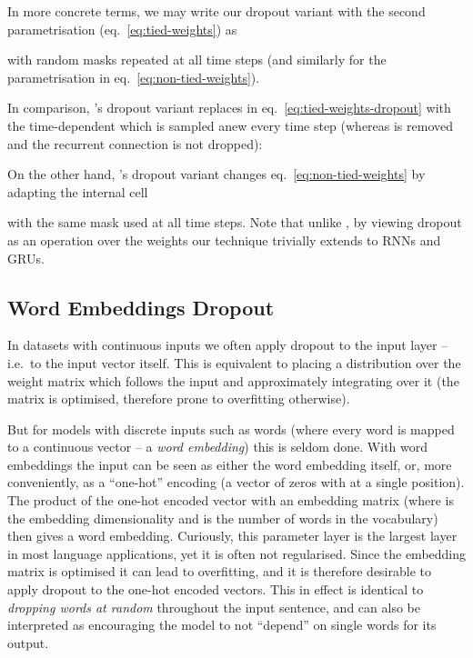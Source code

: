 \documentclass{article}
\theoremstyle{definition}
\begin{document}
\newcommand{\bd}{\mathtt{z}}
In more concrete terms, we may write our dropout variant with the second parametrisation (eq.\ \eqref{eq:tied-weights}) as 

with  random masks repeated at all time steps (and similarly for the parametrisation in eq.\ \eqref{eq:non-tied-weights}). 






In comparison, \citet{zaremba2014recurrent}'s dropout variant replaces  in eq.\ \eqref{eq:tied-weights-dropout} with the time-dependent  which is sampled anew every time step (whereas  is removed and the recurrent connection  is not dropped):

On the other hand, \citet{moon2015rnndrop}'s dropout variant changes eq.\ \eqref{eq:non-tied-weights} by adapting the internal cell 

with the same mask  used at all time steps. Note that unlike \citep{moon2015rnndrop}, by viewing dropout as an operation over the weights our technique trivially extends to RNNs and GRUs.










\subsection{Word Embeddings Dropout}
In datasets with continuous inputs we often apply dropout to the input layer -- i.e.\ to the input vector itself. This is equivalent to placing a distribution over the weight matrix which follows the input and approximately integrating over it (the matrix is optimised, therefore prone to overfitting otherwise). 


But for models with discrete inputs such as words (where every word is mapped to a continuous vector -- a \textit{word embedding}) this is seldom done.
With word embeddings the input can be seen as either the word embedding itself, or, more conveniently, as a ``one-hot'' encoding (a vector of zeros with  at a single position). The product of the one-hot encoded vector with an embedding matrix  (where  is the embedding dimensionality and  is the number of words in the vocabulary) then gives a word embedding.
Curiously, this parameter layer is the largest layer in most language applications, yet it is often not regularised. 
Since the embedding matrix is optimised it can lead to overfitting, and it is therefore desirable to apply dropout to the one-hot encoded vectors.
This in effect is identical to \textit{dropping words at random} throughout the input sentence, and can also be interpreted as encouraging the model to not ``depend'' on single words for its output.
\end{document}
